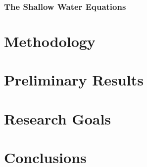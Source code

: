 \documentclass[12pt]{article}
\newcommand{\refdir}{../dissertation}
\newcommand{\contentdir}{../dissertation/content}
\begin{document}
\subsubsection{The Shallow Water Equations\label{sec:sw_model}}

\section{Methodology\label{sec:methodology}}
\section{Preliminary Results\label{sec:results}}

\section{Research Goals\label{sec:goals}}

\section{Conclusions\label{sec:conclusions}}




\end{document}
